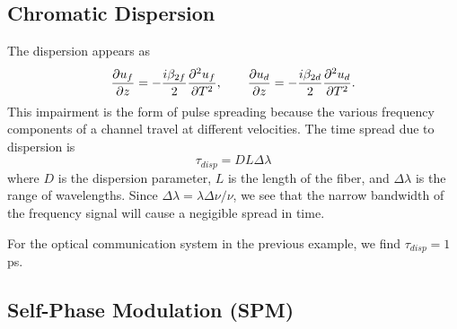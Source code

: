 \subsection{Chromatic Dispersion}

The dispersion appears as
%
\begin{equation*}
\frac{\partial u_f}{\partial z} = -\frac{i\beta_{2f}}{2}\frac{\partial ^2u_f}{\partial T^2}, \qquad \frac{\partial u_d}{\partial z} = -\frac{i\beta_{2d}}{2}\frac{\partial ^2u_d}{\partial T^2}.
\end{equation*}
%
This impairment is the form of pulse spreading because the various frequency components of a channel travel at different velocities. The time spread due to dispersion is
%
\begin{equation}
\tau_{disp} = DL\Delta \lambda 
\end{equation}
%
where $D$ is the dispersion parameter, $L$ is the length of the fiber, and $\Delta\lambda$ is the range of wavelengths. Since $\Delta\lambda = \lambda\Delta\nu/\nu$, we see that the narrow bandwidth of the frequency signal will cause a negigible spread in time.

For the optical communication system in the previous example, we find $\tau_{disp} = 1$ ps.

%
%
%
%
%


\subsection{Self-Phase Modulation (SPM)}

